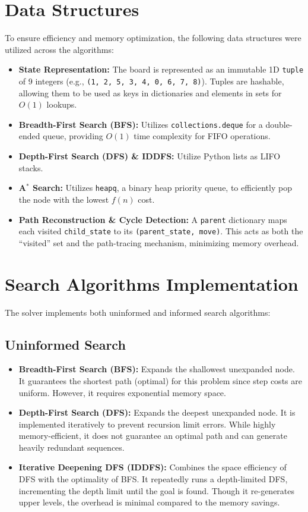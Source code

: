 \documentclass[11pt, a4paper]{article}
\begin{document}
\section{Data Structures}
To ensure efficiency and memory optimization, the following data structures were utilized across the algorithms:
\begin{itemize}
    \item \textbf{State Representation:} The board is represented as an immutable 1D \texttt{tuple} of 9 integers (e.g., \texttt{(1, 2, 5, 3, 4, 0, 6, 7, 8)}). Tuples are hashable, allowing them to be used as keys in dictionaries and elements in sets for $O(1)$ lookups.
    \item \textbf{Breadth-First Search (BFS):} Utilizes \texttt{collections.deque} for a double-ended queue, providing $O(1)$ time complexity for FIFO operations.
    \item \textbf{Depth-First Search (DFS) \& IDDFS:} Utilize Python lists as LIFO stacks.
    \item \textbf{A$^*$ Search:} Utilizes \texttt{heapq}, a binary heap priority queue, to efficiently pop the node with the lowest $f(n)$ cost.
    \item \textbf{Path Reconstruction \& Cycle Detection:} A \texttt{parent} dictionary maps each visited \texttt{child\_state} to its \texttt{(parent\_state, move)}. This acts as both the ``visited'' set and the path-tracing mechanism, minimizing memory overhead.
\end{itemize}

\section{Search Algorithms Implementation}
The solver implements both uninformed and informed search algorithms:

\subsection{Uninformed Search}
\begin{itemize}
    \item \textbf{Breadth-First Search (BFS):} Expands the shallowest unexpanded node. It guarantees the shortest path (optimal) for this problem since step costs are uniform. However, it requires exponential memory space.
    \item \textbf{Depth-First Search (DFS):} Expands the deepest unexpanded node. It is implemented iteratively to prevent recursion limit errors. While highly memory-efficient, it does not guarantee an optimal path and can generate heavily redundant sequences.
    \item \textbf{Iterative Deepening DFS (IDDFS):} Combines the space efficiency of DFS with the optimality of BFS. It repeatedly runs a depth-limited DFS, incrementing the depth limit until the goal is found. Though it re-generates upper levels, the overhead is minimal compared to the memory savings.
\end{itemize}
\end{document}
